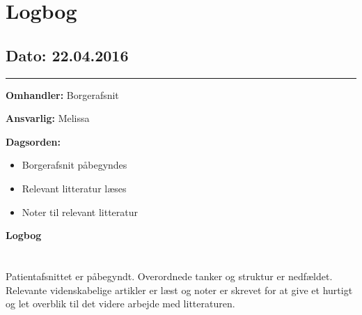 \chapter{Logbog}

\section{Dato: 22.04.2016}
\hrule

\textbf{Omhandler:} Borgerafsnit

\textbf{Ansvarlig:} Melissa

\textbf{Dagsorden:}
\begin{itemize}
	\item Borgerafsnit påbegyndes
	\item Relevant litteratur læses
	\item Noter til relevant litteratur
\end{itemize}

\textbf{Logbog}
\\
\\ \\
Patientafsnittet er påbegyndt. Overordnede tanker og struktur er nedfældet. Relevante videnskabelige artikler er læst og noter er skrevet for at give et hurtigt og let overblik til det videre arbejde med litteraturen.



